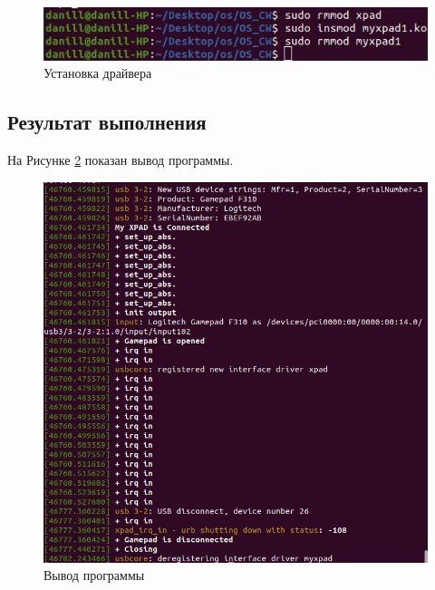 \begin{figure}[h!]
	\centering
	\includegraphics[scale=0.9]{img/sudo.jpg}
	\caption{Установка драйвера}
	\label{sudo}
\end{figure}\par

\subsection{Результат выполнения}
На Рисунке \ref{dmesg} показан вывод программы.
\begin{figure}[h!]
	\centering
	\includegraphics[scale=0.9]{img/ex1.jpg}
	\caption{Вывод программы}
	\label{dmesg}
\end{figure}\par





\pagebreak
